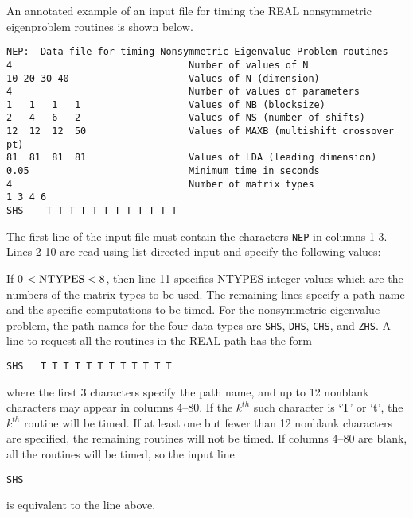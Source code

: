 An annotated example of an input file for timing the
REAL nonsymmetric eigenproblem routines is shown below.

\begin{verbatim}
NEP:  Data file for timing Nonsymmetric Eigenvalue Problem routines
4                               Number of values of N
10 20 30 40                     Values of N (dimension)
4                               Number of values of parameters
1   1   1   1                   Values of NB (blocksize)
2   4   6   2                   Values of NS (number of shifts)
12  12  12  50                  Values of MAXB (multishift crossover pt)
81  81  81  81                  Values of LDA (leading dimension)
0.05                            Minimum time in seconds
4                               Number of matrix types
1 3 4 6 
SHS    T T T T T T T T T T T T 
\end{verbatim}

The first line of the input file 
must contain the characters {\tt NEP} in columns 1-3.
Lines 2-10 are read using list-directed input and specify the following
values:


If 0 $< {\rm NTYPES} < 8 $,
then line 11 specifies NTYPES integer values
which are the numbers of the matrix types to be used.
The remaining lines specify a path name and the specific
computations to be timed. 
For the nonsymmetric eigenvalue problem, the path names for the four
data types are {\tt SHS}, {\tt DHS}, {\tt CHS}, and {\tt ZHS}. 
A line to request all the routines in the REAL path has the form
\begin{verbatim}
SHS   T T T T T T T T T T T T
\end{verbatim}
where the first 3 characters specify the path name,
and up to 12 nonblank characters may appear in columns 4--80. 
If the $k^{th}$ such character is `T' or `t',
the $k^{th}$ routine will be timed. 
If at least one but fewer than 12 nonblank characters are specified, the
remaining routines will not be timed. 
If columns 4--80 are blank, all the routines will be timed,
so the input line
\begin{verbatim}
SHS
\end{verbatim}
is equivalent to the line above.

